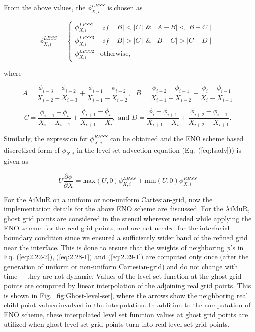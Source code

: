 \documentclass[preprint,12pt]{elsarticle}
\newcommand{\review}[1]{\color{black}#1}
\begin{document}
From the above values, the $\phi_{X,i}^{LBSS}$ is chosen as

\begin{equation}
\phi_{X,i}^{LBSS}=\begin{cases}
\phi_{X,i}^{LBSS1} & \begin{array}{cc}
if\end{array}\mid B\mid<\mid C\mid\&\mid A-B\mid<\mid B-C\mid\\
\phi_{X,i}^{LBSS3} & \begin{array}{cc}
if\end{array}\mid B\mid>\mid C\mid\&\mid B-C\mid>\mid C-D\mid\\
\phi_{X,i}^{LBSS2} & \text{otherwise},
\end{cases}\label{eq:2.22-1-1}
\end{equation}


where

\[
A=\frac{\phi_{i-3}-\phi_{i-2}}{X_{i-2}-X_{i-3}}+\frac{\phi_{i-1}-\phi_{i-2}}{X_{i-1}-X_{i-2}},\,\,\,\, B=\frac{\phi_{i-2}-\phi_{i-1}}{X_{i-1}-X_{i-2}}+\frac{\phi_{i}-\phi_{i-1}}{X_{i}-X_{i-1}}
\]


\[
C=\frac{\phi_{i-1}-\phi_{i}}{X_{i}-X_{i-1}}+\frac{\phi_{i+1}-\phi_{i}}{X_{i+1}-X_{i}},\,\, \text{and}\,\, D=\frac{\phi_{i}-\phi_{i+1}}{X_{i+1}-X_{i}}+\frac{\phi_{i+2}-\phi_{i+1}}{X_{i+2}-X_{i+1}}.
\]


Similarly, the expression for $\phi_{X,i}^{RBSS}$ can be obtained
and the ENO scheme based discretized form of $\phi_{X,i}$ in the level
set advection equation (Eq.~(\ref{eq:lsadv})) is given as

\begin{equation}
U\frac{\partial\phi}{\partial X}=\text{max}(U,0)\phi_{X,i}^{LBSS}+\text{min}(U,0)\phi_{X,i}^{RBSS}
\end{equation}


For the AiMuR
on a uniform or non-uniform Cartesian-grid, now the implementation details for the above ENO scheme are discussed. \review{For the AiMuR, ghost grid points are considered in the stencil wherever needed while applying the ENO scheme for the real grid points; and are not needed for the interfacial boundary condition since we ensured a sufficiently wider band of the refined grid near the interface.}
 This is done to ensure that the weights of neighboring $\phi'$s in Eq.
(\ref{eq:2.22-2}), (\ref{eq:2.28-1}) and (\ref{eq:2.29-1}) are
computed only once (after the generation of uniform or non-uniform
Cartesian-grid) and do not change with time $-$ they are not dynamic.
Values of the level set function at the ghost grid points are computed
by linear interpolation of the adjoining real grid points. This
is shown in Fig.~\ref{fig:Ghost-level-set}, where the arrows show
the neighboring real child point values involved in the interpolation.
In addition to the computation of ENO scheme, these interpolated level
set function values at ghost grid points are utilized when ghost level
set grid points turn into real level set grid points.
\end{document}
